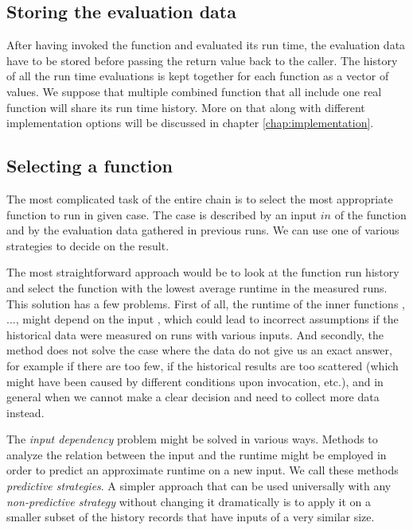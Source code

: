 \subsection{Storing the evaluation data}

After having invoked the function and evaluated its run time, the evaluation data have to be stored before passing the return value back to the caller. The history of all the run time evaluations is kept together for each function as a vector of values. We suppose that multiple combined function that all include one real function will share its run time history. More on that along with different implementation options will be discussed in chapter \ref{chap:implementation}.

\subsection{Selecting a function}

The most complicated task of the entire chain is to select the most appropriate function to run in given case. The case is described by an input $in$ of the function  and by the evaluation data gathered in previous runs. We can use one of various strategies to decide on the result.

The most straightforward approach would be to look at the function run history and select the function with the lowest average runtime in the measured runs. This solution has a few problems. First of all, the runtime of the inner functions , ...,  might depend on the input , which could lead to incorrect assumptions if the historical data were measured on runs with various inputs. And secondly, the method does not solve the case where the data do not give us an exact answer, for example if there are too few, if the historical results are too scattered (which might have been caused by different conditions upon invocation, etc.), and in general when we cannot make a clear decision and need to collect more data instead.

The \textit{input dependency} problem might be solved in various ways. Methods to analyze the relation between the input and the runtime might be employed in order to predict an approximate runtime on a new input. We call these methods \textit{predictive strategies}. A simpler approach that can be used universally with any \textit{non-predictive strategy} without changing it dramatically is to apply it on a smaller subset of the history records that have inputs of a very similar size. 

